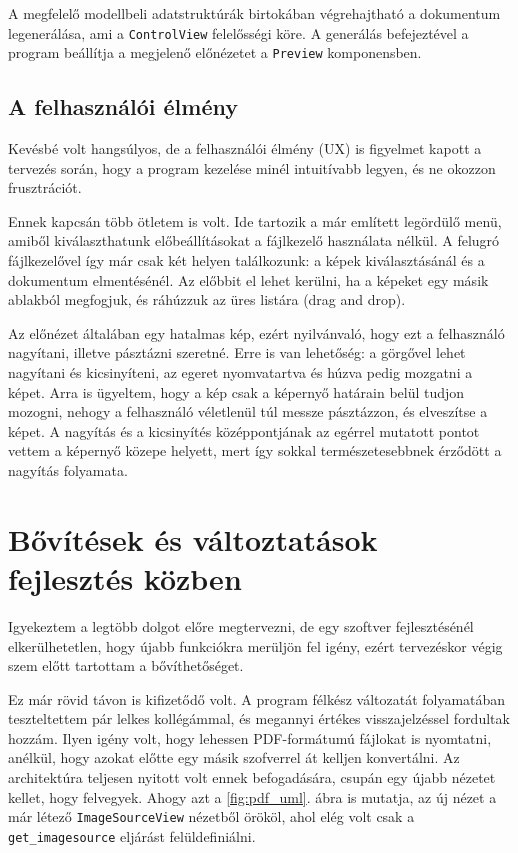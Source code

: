A megfelelő modellbeli adatstruktúrák birtokában végrehajtható a dokumentum legenerálása, ami a \texttt{ControlView} felelősségi köre. A generálás befejeztével a program beállítja a megjelenő előnézetet a \texttt{Preview} komponensben. 


\subsection{A felhasználói élmény}

Kevésbé volt hangsúlyos, de a felhasználói élmény (UX) is figyelmet kapott a tervezés során, hogy a program kezelése minél intuitívabb legyen, és ne okozzon frusztrációt. 

Ennek kapcsán több ötletem is volt. Ide tartozik a már említett legördülő menü, amiből kiválaszthatunk előbeállításokat a fájlkezelő használata nélkül. A felugró fájlkezelővel így már csak két helyen találkozunk: a képek kiválasztásánál és a dokumentum elmentésénél. Az előbbit el lehet kerülni, ha a képeket egy másik ablakból megfogjuk, és ráhúzzuk az üres listára (drag and drop).

Az előnézet általában egy hatalmas kép, ezért nyilvánvaló, hogy ezt a felhasználó nagyítani, illetve pásztázni szeretné. Erre is van lehetőség: a görgővel lehet nagyítani és kicsinyíteni, az egeret nyomvatartva és húzva pedig mozgatni a képet. Arra is ügyeltem, hogy a kép csak a képernyő határain belül tudjon mozogni, nehogy a felhasználó véletlenül túl messze pásztázzon, és elveszítse a képet. A nagyítás és a kicsinyítés középpontjának az egérrel mutatott pontot vettem a képernyő közepe helyett, mert így sokkal természetesebbnek érződött a nagyítás folyamata.

\newpage
\section{Bővítések és változtatások fejlesztés közben}

Igyekeztem a legtöbb dolgot előre megtervezni, de egy szoftver fejlesztésénél elkerülhetetlen, hogy újabb funkciókra merüljön fel igény, ezért tervezéskor végig szem előtt tartottam a bővíthetőséget.

Ez már rövid távon is kifizetődő volt. A program félkész változatát folyamatában teszteltettem pár lelkes kollégámmal, és megannyi értékes visszajelzéssel fordultak hozzám. Ilyen igény volt, hogy lehessen PDF-formátumú fájlokat is nyomtatni, anélkül, hogy azokat előtte egy másik szofverrel át kelljen konvertálni. Az architektúra teljesen nyitott volt ennek befogadására, csupán egy újabb nézetet kellet, hogy felvegyek. Ahogy azt a \ref{fig:pdf_uml}. ábra is mutatja, az új nézet a már létező \texttt{ImageSourceView} nézetből örököl, ahol elég volt csak a \texttt{get\_imagesource} eljárást felüldefiniálni.

